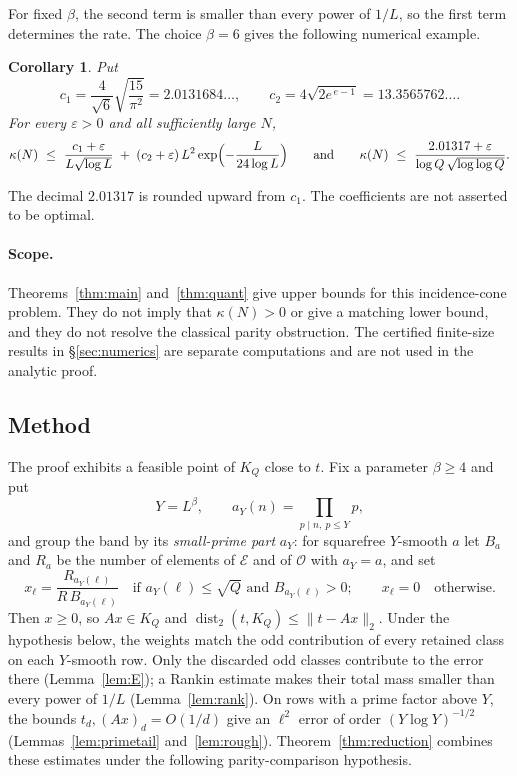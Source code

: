 \documentclass[11pt,a4paper]{article}
\theoremstyle{plain}
\newtheorem{corollary}[theorem]{Corollary}
\theoremstyle{definition}
\theoremstyle{remark}
\DeclareMathOperator{\dist}{dist}
\newcommand{\vB}{\mathcal{E}}
\newcommand{\vR}{\mathcal{O}}
\newcommand{\eps}{\varepsilon}
\begin{document}
For fixed $\beta$, the second term is smaller than every power of $1/L$, so the first term determines
the rate. The choice $\beta=6$ gives the following numerical example.

\begin{corollary}\label{cor:beta6}
Put
\[
  c_{1}=\frac4{\sqrt6}\sqrt{\frac{15}{\pi^{2}}}=2.0131684\ldots,\qquad
  c_{2}=4\sqrt{2e^{\,e-1}}=13.3565762\ldots .
\]
For every $\eps>0$ and all sufficiently large $N$,
\[
  \kappa(N)\ \le\ \frac{c_{1}+\eps}{L\sqrt{\log L}}
   \;+\;(c_{2}+\eps)\,L^{2}\exp\Bigl(-\frac L{24\log L}\Bigr)
  \qquad\text{and}\qquad
  \kappa(N)\ \le\ \frac{2.01317+\eps}{\log Q\,\sqrt{\log\log Q}} .
\]
\end{corollary}

The decimal $2.01317$ is rounded upward from $c_1$. The coefficients are not asserted to be optimal.

\paragraph{Scope.}\label{par:scope}
Theorems~\ref{thm:main} and~\ref{thm:quant} give upper bounds for this incidence-cone problem.
They do not imply that $\kappa(N)>0$ or give a matching lower bound, and they do not resolve the
classical parity obstruction.
The certified finite-size results in \S\ref{sec:numerics} are separate computations and are not used
in the analytic proof.

\subsection{Method}\label{sec:method}
The proof exhibits a feasible point of $K_{Q}$ close to $t$. Fix a parameter $\beta\ge4$ and put
\begin{equation}\label{eq:Yparam}
  Y=L^{\beta},\qquad a_{Y}(n)=\prod_{p\mid n,\ p\le Y}p ,
\end{equation}
and group the band by its \emph{small-prime part} $a_Y$: for squarefree $Y$-smooth $a$ let $B_{a}$ and $R_{a}$ be the number of
elements of $\vB$ and of $\vR$ with $a_{Y}=a$, and set
\begin{equation}\label{eq:X}
  x_{\ell}=\frac{R_{a_{Y}(\ell)}}{R\,B_{a_{Y}(\ell)}}\quad\text{if }a_{Y}(\ell)\le\sqrt Q
  \text{ and }B_{a_{Y}(\ell)}>0;\qquad x_{\ell}=0\quad\text{otherwise}.
\end{equation}
Then $x\ge0$, so $Ax\in K_Q$ and $\dist_2(t,K_Q)\le\|t-Ax\|_2$. Under the hypothesis below, the
weights match the odd contribution of every retained class on each $Y$-smooth row. Only the discarded
odd classes contribute to the error there (Lemma~\ref{lem:E}); a Rankin estimate makes their total
mass smaller than every power of $1/L$ (Lemma~\ref{lem:rank}). On rows with a prime factor above $Y$,
the bounds $t_d,(Ax)_d=O(1/d)$ give an $\ell^2$ error of order $(Y\log Y)^{-1/2}$
(Lemmas~\ref{lem:primetail} and~\ref{lem:rough}). Theorem~\ref{thm:reduction} combines these estimates
under the following parity-comparison hypothesis.
\end{document}
